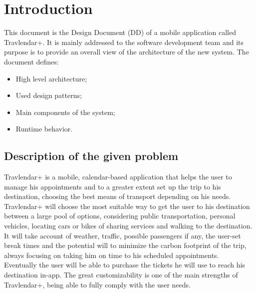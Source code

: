 %
%
\chapter{Introduction}
%
\label{cap:introduction}
%
%
This document is the Design Document (DD) of a mobile application called Travlendar+. It is mainly addressed to the software development team and its purpose is to provide an overall view of the architecture of the new system. The document defines: 
\begin{itemize}
\item	High level architecture;
\item	Used design patterns;
\item	Main components of the system;
\item	Runtime behavior.
\end{itemize}
%
%
\section{Description of the given problem}
Travlendar+ is a mobile, calendar-based application that helps the user to manage his appointments and to a greater extent set up the trip to his destination, choosing the best means of transport depending on his needs. \\
Travlendar+ will choose the most suitable way to get the user to his destination between a large pool of options, considering public transportation, personal vehicles, locating cars or bikes of sharing services and walking to the destination. It will take account of weather, traffic, possible passengers if any, the user-set break times and the potential will to minimize the carbon footprint of the trip, always focusing on taking him on time to his scheduled appointments. \\
Eventually the user will be able to purchase the tickets he will use to reach his destination in-app. The great customizability is one of the main strengths of Travlendar+, being able to fully comply with the user needs. 
%
%
